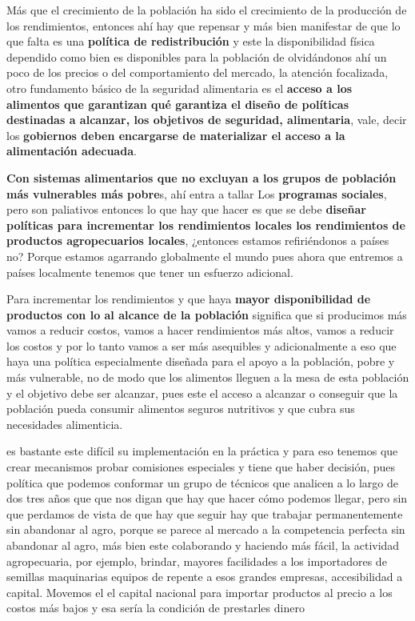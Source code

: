\documentclass[
  a4paper,
]{article}
\begin{document}
Más que el crecimiento de la población ha sido el crecimiento de la
producción de los rendimientos, entonces ahí hay que repensar y más bien
manifestar de que lo que falta es una \textbf{política de
redistribución} y este la disponibilidad física dependido como bien es
disponibles para la población de olvidándonos ahí un poco de los precios
o del comportamiento del mercado, la atención focalizada, otro
fundamento básico de la seguridad alimentaria es el \textbf{acceso a los
alimentos que garantizan qué garantiza el diseño de políticas destinadas
a alcanzar, los objetivos de seguridad, alimentaria}, vale, decir los
\textbf{gobiernos deben encargarse de materializar el acceso a la
alimentación adecuada}.

\textbf{Con sistemas alimentarios que no excluyan a los grupos de
población más vulnerables más pobre}s, ahí entra a tallar Los
\textbf{programas sociales}, pero son paliativos entonces lo que hay que
hacer es que se debe \textbf{diseñar políticas para incrementar los
rendimientos locales los rendimientos de productos agropecuarios
locales}, ¿entonces estamos refiriéndonos a países no? Porque estamos
agarrando globalmente el mundo pues ahora que entremos a países
localmente tenemos que tener un esfuerzo adicional.

Para incrementar los rendimientos y que haya \textbf{mayor
disponibilidad de productos con lo al alcance de la población} significa
que si producimos más vamos a reducir costos, vamos a hacer rendimientos
más altos, vamos a reducir los costos y por lo tanto vamos a ser más
asequibles y adicionalmente a eso que haya una política especialmente
diseñada para el apoyo a la población, pobre y más vulnerable, no de
modo que los alimentos lleguen a la mesa de esta población y el objetivo
debe ser alcanzar, pues este el acceso a alcanzar o conseguir que la
población pueda consumir alimentos seguros nutritivos y que cubra sus
necesidades alimenticia.

es bastante este difícil su implementación en la práctica y para eso
tenemos que crear mecanismos probar comisiones especiales y tiene que
haber decisión, pues política que podemos conformar un grupo de técnicos
que analicen a lo largo de dos tres años que que nos digan que hay que
hacer cómo podemos llegar, pero sin que perdamos de vista de que hay que
seguir hay que trabajar permanentemente sin abandonar al agro, porque se
parece al mercado a la competencia perfecta sin abandonar al agro, más
bien este colaborando y haciendo más fácil, la actividad agropecuaria,
por ejemplo, brindar, mayores facilidades a los importadores de semillas
maquinarias equipos de repente a esos grandes empresas, accesibilidad a
capital. Movemos el el capital nacional para importar productos al
precio a los costos más bajos y esa sería la condición de prestarles
dinero
\end{document}
